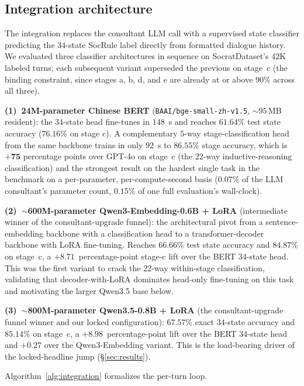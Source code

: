 \documentclass[11pt]{article}
\begin{document}
\subsection{Integration architecture}

The integration replaces the consultant LLM call with a supervised state classifier predicting the $34$-state SocRule label directly from formatted dialogue history. We evaluated three classifier architectures in sequence on SocratDataset's $42$K labeled turns; each subsequent variant superseded the previous on stage~c (the binding constraint, since stages a, b, d, and e are already at or above $90\%$ across all three).

\noindent\textbf{(1)~24M-parameter Chinese BERT} (\texttt{BAAI/bge-small-zh-v1.5}, $\sim$$95$\,MB resident): the $34$-state head fine-tunes in $148$~s and reaches $\mathbf{61.64\%}$ test state accuracy ($76.16\%$ on stage c). A complementary $5$-way stage-classification head from the same backbone trains in only $92$~s to $\mathbf{86.55\%}$ stage accuracy, which is $\mathbf{+75}$ percentage points over GPT-4o on stage~c (the $22$-way inductive-reasoning classification) and the strongest result on the hardest single task in the benchmark on a per-parameter, per-compute-second basis ($0.07\%$ of the LLM consultant's parameter count, $0.15\%$ of one full evaluation's wall-clock).

\noindent\textbf{(2)~$\sim$600M-parameter Qwen3-Embedding-0.6B + LoRA} (intermediate winner of the consultant-upgrade funnel): the architectural pivot from a sentence-embedding backbone with a classification head to a transformer-decoder backbone with LoRA fine-tuning. Reaches $\mathbf{66.66\%}$ test state accuracy and $\mathbf{84.87\%}$ on stage~c, a $+8.71$~percentage-point stage-c lift over the BERT 34-state head. This was the first variant to crack the 22-way within-stage classification, validating that decoder-with-LoRA dominates head-only fine-tuning on this task and motivating the larger Qwen3.5 base below.

\noindent\textbf{(3)~$\sim$800M-parameter Qwen3.5-0.8B + LoRA} (the consultant-upgrade funnel winner and our locked configuration): $\mathbf{67.57\%}$ exact $34$-state accuracy and $\mathbf{85.14\%}$ on stage~c, a $\mathbf{+8.98}$~percentage-point lift over the BERT 34-state head and $+0.27$ over the Qwen3-Embedding variant. This is the load-bearing driver of the locked-headline jump (\S\ref{sec:results}).

\noindent Algorithm~\ref{alg:integration} formalizes the per-turn loop.
\end{document}
